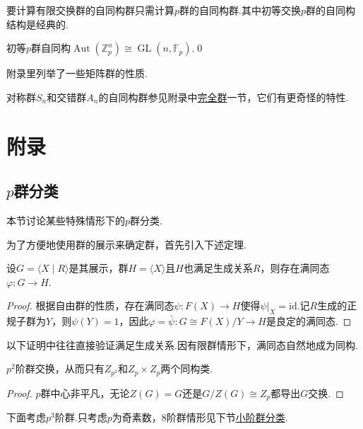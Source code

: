 要计算有限交换群的自同构群只需计算$p$群的自同构群.其中初等交换$p$群的自同构结构是经典的.
\begin{prop}
	初等$p$群自同构$\operatorname*{Aut}(\mathbb{Z}_p^n)\cong\operatorname*{GL}(n,\mathbb{F}_p)$.\qed
\end{prop}
\begin{remark}
	附录里列举了一些矩阵群的性质.
\end{remark}

对称群$S_n$和交错群$A_n$的自同构群参见附录中\hyperlink{subsec:CompleteGrp}{完全群}一节，它们有更奇怪的特性.

\section{附录}
\subsection{\texorpdfstring{$p$群分类}{p群分类}}
本节讨论某些特殊情形下的$p$群分类.

为了方便地使用群的展示来确定群，首先引入下述定理.
\begin{thm}
	设$G=\langle X\mid R\rangle $是其展示，群$H=\langle X\rangle $且$H$也满足生成关系$R$，则存在满同态$\varphi\colon G\to H$.
\end{thm}
\begin{proof}
	根据自由群的性质，存在满同态$\psi\colon F(X)\to H$使得$\psi|_X=\mathrm{id}$.记$R$生成的正规子群为$Y$，则$\psi(Y)=1$，因此$\varphi=\bar\psi\colon G\cong F(X)/Y\to H$是良定的满同态.
\end{proof}
\begin{remark}
	以下证明中往往直接验证满足生成关系.因有限群情形下，满同态自然地成为同构.
\end{remark}

\begin{prop}
	$p^2$阶群交换，从而只有$Z_{p^2}$和$Z_p\times Z_p$两个同构类.
\end{prop}
\begin{proof}
	$p$群中心非平凡，无论$Z(G)=G$还是$G/Z(G)\cong Z_p$都导出$G$交换.
\end{proof}

下面考虑$p^3$阶群.只考虑$p$为奇素数，$8$阶群情形见下节\hyperref[subsec:ClassificationSmallOrder]{小阶群分类}.

